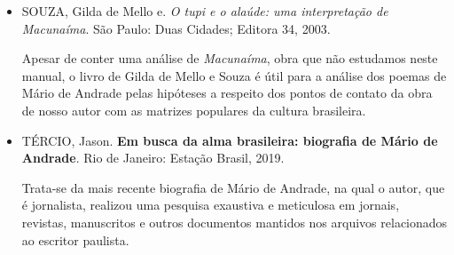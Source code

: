 \documentclass[11pt]{extarticle}
\begin{document}
\begin{itemize}
\item SOUZA, Gilda de Mello e. \emph{O tupi e o alaúde: uma interpretação de
\emph{Macunaíma}}. São Paulo: Duas Cidades; Editora 34, 2003.

Apesar de conter uma análise de \emph{Macunaíma}, obra que não estudamos
neste manual, o livro de Gilda de Mello e Souza é útil para a análise
dos poemas de Mário de Andrade pelas hipóteses a respeito dos pontos de
contato da obra de nosso autor com as matrizes populares da cultura
brasileira.

\item TÉRCIO, Jason. \textbf{Em busca da alma brasileira: biografia de Mário
de Andrade}. Rio de Janeiro: Estação Brasil, 2019.

Trata-se da mais recente biografia de Mário de Andrade, na qual o autor,
que é jornalista, realizou uma pesquisa exaustiva e meticulosa em
jornais, revistas, manuscritos e outros documentos mantidos nos arquivos
relacionados ao escritor paulista.

\end{itemize}
\end{document}
